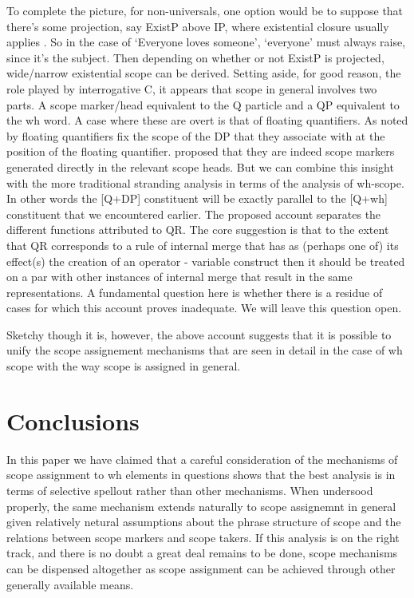 \documentclass{glossa}
\begin{document}
To complete the picture, for non-universals, one option would be to  suppose that there's some projection, say ExistP above IP, where existential closure usually applies \citep{kratzer:2005}. So in the case of  `Everyone loves someone', `everyone' must always raise, since it's the subject. Then depending on whether or not ExistP is projected,  wide/narrow existential scope can be derived.  Setting aside, for good reason, the role played by interrogative C, it appears that scope in general involves two parts.  A scope marker/head equivalent to the Q particle and a QP equivalent to the wh word.  A case where these are overt is that of floating quantifiers.  As noted by \citet{dowty-brodie:1984} floating quantifiers fix the scope of the DP that they associate with at the position of the floating quantifier.  \citet{tsoulas:2003} proposed that they are indeed scope markers generated directly in the relevant scope heads.  But we can combine this insight with the more traditional stranding analysis in terms of the analysis of wh-scope.  In other words the [Q+DP] constituent will be exactly parallel to the [Q+wh] constituent that we encountered earlier.
The proposed account separates the different functions attributed to QR. The core suggestion is that to the extent that QR corresponds to a rule of internal merge that has as (perhaps one of) its effect(s) the creation of an operator - variable construct then it should be treated on a par with other instances of internal merge that result in the same representations.  A fundamental question here is whether there is a residue of cases for which this account proves inadequate. We will leave this question open. 

Sketchy though it is, however, the above account suggests that it is possible to unify the scope assignement mechanisms that are seen in detail in the case of wh scope with the way scope is assigned in general.  

\section{Conclusions}
In this paper we have claimed that a careful consideration of the mechanisms of scope assignment to wh elements in questions shows that the best analysis is in terms of selective spellout rather than other mechanisms.  When undersood properly, the same mechanism extends naturally to scope assignemnt in general given relatively netural assumptions about the phrase structure of scope and the relations between scope markers and scope takers.  If this analysis is on the right track, and there is no doubt a great deal remains to be done, scope mechanisms can be dispensed altogether as scope assignment can be achieved through other generally available means.
\end{document}
